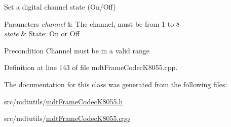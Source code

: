 Set a digital channel state (On/\-Off) 


\begin{DoxyParams}{Parameters}
{\em channel} & The channel, must be from 1 to 8 \\
\hline
{\em state} & State\-: On or Off \\
\hline
\end{DoxyParams}
\begin{DoxyPrecond}{Precondition}
Channel must be in a valid range 
\end{DoxyPrecond}


Definition at line 143 of file mdt\-Frame\-Codec\-K8055.\-cpp.



The documentation for this class was generated from the following files\-:\begin{DoxyCompactItemize}
\item 
src/mdtutils/\hyperlink{mdt_frame_codec_k8055_8h}{mdt\-Frame\-Codec\-K8055.\-h}\item 
src/mdtutils/\hyperlink{mdt_frame_codec_k8055_8cpp}{mdt\-Frame\-Codec\-K8055.\-cpp}\end{DoxyCompactItemize}
